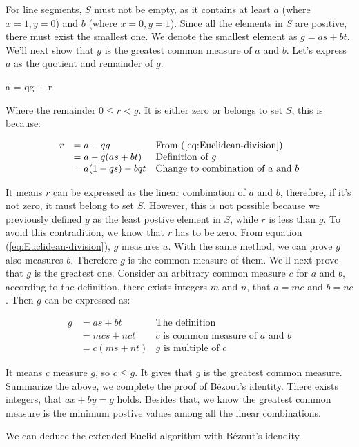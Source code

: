 \documentclass[b5paper]{article}
\begin{document}
For line segments, $S$ must not be empty, as it contains at least $a$ (where $x = 1, y = 0$) and $b$ (where $x = 0, y = 1$). Since all the elements in $S$ are positive, there must exist the smallest one. We denote the smallest element as $g = as + bt$. We'll next show that $g$ is the greatest common measure of $a$ and $b$. Let's express $a$ as the quotient and remainder of $g$.

\be
a = qg + r
\label{eq:Euclidean-division}
\ee

Where the remainder $0 \leq r < g$. It is either zero or belongs to set $S$, this is because:

\[
\begin{array}{rll}
r & = a - qg & \text{From (\ref{eq:Euclidean-division})} \\
  & = a - q(as + bt) & \text{Definition of}\ g \\
  & = a(1 - qs) - bqt & \text{Change to combination of}\ a\ \text{and}\ b
\end{array}
\]

It means $r$ can be expressed as the linear combination of $a$ and $b$, therefore, if it's not zero, it must belong to set $S$. However, this is not possible because we previously defined $g$ as the least postive element in $S$, while $r$ is less than $g$. To avoid this contradition, we know that $r$ has to be zero. From equation (\ref{eq:Euclidean-division}), $g$ measures $a$. With the same method, we can prove $g$ also measures $b$. Therefore $g$ is the common measure of them. We'll next prove that $g$ is the greatest one. Consider an arbitrary common measure $c$ for $a$ and $b$, according to the definition, there exists integers $m$ and $n$, that $a = mc$ and $b = nc$. Then $g$ can be expressed as:

\[
\begin{array}{rll}
g & = as + bt & \text{The definition} \\
  & = mcs + nct & \text{$c$ is common measure of $a$ and $b$} \\
  & = c(ms + nt) & \text{$g$ is multiple of $c$}
\end{array}
\]

It means $c$ measure $g$, so $c \leq g$. It gives that $g$ is the greatest common measure. Summarize the above, we complete the proof of Bézout's identity. There exists integers, that $ax + by = g$ holds. Besides that, we know the greatest common measure is the minimum postive values among all the linear combinations.

We can deduce the extended Euclid algorithm with Bézout's idendity.
\end{document}
